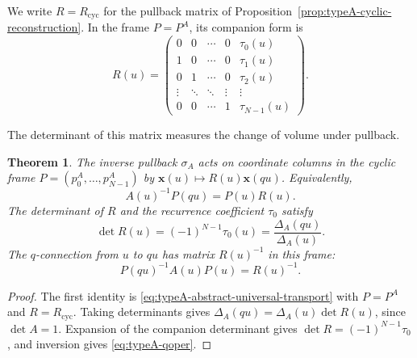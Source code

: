 \documentclass[11pt,leqno]{amsart}
\numberwithin{equation}{section}
\theoremstyle{plain}
\newtheorem{theorem}{Theorem}[section]
\theoremstyle{definition}
\theoremstyle{plain}
\theoremstyle{definition}
\theoremstyle{remark}
\begin{document}
We write $R=R_{\mathrm{cyc}}$ for the pullback matrix of Proposition~\ref{prop:typeA-cyclic-reconstruction}. In the frame $P=P^A$, its companion form is
\begin{equation}\label{eq:typeA-companion}
 R(u)=
 \begin{pmatrix}
 0&0&\cdots&0&\tau_0(u)\\
 1&0&\cdots&0&\tau_1(u)\\
 0&1&\cdots&0&\tau_2(u)\\
 \vdots&\ddots&\ddots&\vdots&\vdots\\
 0&0&\cdots&1&\tau_{N-1}(u)
 \end{pmatrix}.
\end{equation}

The determinant of this matrix measures the change of volume under pullback.

\begin{theorem}\label{thm:typeA-Wronskian}\label{lem:typeA-matrix-shift}
The inverse pullback $\sigma_A$ acts on coordinate columns in the cyclic frame $P=(p_0^A,\ldots,p_{N-1}^A)$ by $\mathbf x(u)\mapsto R(u)\mathbf x(qu)$. Equivalently,
\begin{equation}\label{eq:typeA-matrix-shift}
 A(u)^{-1}P(qu)=P(u)R(u).
\end{equation}
The determinant of $R$ and the recurrence coefficient $\tau_0$ satisfy
\begin{equation}\label{eq:typeA-tau0}
 \det R(u)=(-1)^{N-1}\tau_0(u)=\frac{\Delta_A(qu)}{\Delta_A(u)}.
\end{equation}
The $q$-connection from $u$ to $qu$ has matrix $R(u)^{-1}$ in this frame:
\begin{equation}\label{eq:typeA-qoper}
 P(qu)^{-1}A(u)P(u)=R(u)^{-1}.
\end{equation}
\end{theorem}
\begin{proof}
The first identity is \eqref{eq:typeA-abstract-universal-transport} with $P=P^A$ and $R=R_{\mathrm{cyc}}$. Taking determinants gives $\Delta_A(qu)=\Delta_A(u)\det R(u)$, since $\det A=1$. Expansion of the companion determinant gives $\det R=(-1)^{N-1}\tau_0$, and inversion gives \eqref{eq:typeA-qoper}.
\end{proof}
\end{document}
